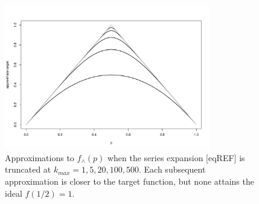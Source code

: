\documentclass{article}
\theoremstyle{definition}
\begin{document}
\begin{figure}
\centering
\includegraphics[width=0.8\textwidth]{approxtarget_1520100500.pdf}
\caption{Approximations to $f_\wedge(p)$ when the series expansion [eqREF] is truncated at $k_{max} = 1,5,20,100,500$. Each subsequent approximation is closer to the target function, but none attains the ideal $f(1/2)=1$.}
\label{fig:qbf_target_approximations}
\end{figure}
\end{document}
